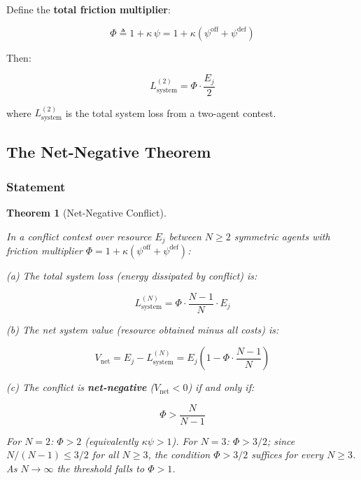 \documentclass[11pt]{article}
\theoremstyle{plain}
\newtheorem{theorem}{Theorem}
\theoremstyle{definition}
\theoremstyle{remark}
\let\origsubsection\subsection
\renewcommand{\subsection}{\needspace{7\baselineskip}\origsubsection}
\let\origsubsubsection\subsubsection
\renewcommand{\subsubsection}{\needspace{4\baselineskip}\origsubsubsection}
\begin{document}
Define the \textbf{total friction multiplier}:

\[\Phi \triangleq 1 + \kappa \, \psi = 1 + \kappa(\psi^{\text{off}} + \psi^{\text{def}})\]

Then:

\[L_{\text{system}}^{(2)} = \Phi \cdot \frac{E_j}{2}\]

where \(L_{\text{system}}^{(2)}\) is the total system loss from a
two-agent contest.

\subsection{The Net-Negative Theorem}\label{the-net-negative-theorem}

\subsubsection{Statement}\label{statement-1}

\begin{theorem}[Net-Negative Conflict]
\label{thm-net-negative-conflict}

In a conflict contest over resource $E_j$ between $N \geq 2$ symmetric agents with friction multiplier $\Phi = 1 + \kappa(\psi^{\text{off}} + \psi^{\text{def}})$:

(a) The total system loss (energy dissipated by conflict) is:

$$L_{\text{system}}^{(N)} = \Phi \cdot \frac{N - 1}{N} \cdot E_j$$

(b) The net system value (resource obtained minus all costs) is:

$$V_{\text{net}} = E_j - L_{\text{system}}^{(N)} = E_j \left(1 - \Phi \cdot \frac{N - 1}{N}\right)$$

(c) The conflict is \textbf{net-negative} ($V_{\text{net}} < 0$) if and only if:

$$\Phi > \frac{N}{N - 1}$$

For $N = 2$: $\Phi > 2$ (equivalently $\kappa\psi > 1$). For $N = 3$: $\Phi > 3/2$; since $N/(N-1) \leq 3/2$ for all $N \geq 3$, the condition $\Phi > 3/2$ suffices for every $N \geq 3$. As $N \to \infty$ the threshold falls to $\Phi > 1$.
\end{theorem}
\end{document}
